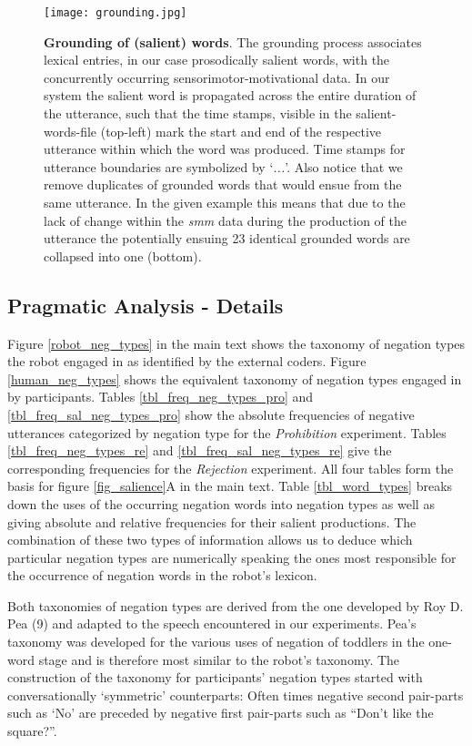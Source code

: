 \begin{screenonly}
\begin{figure}[h]
  \begin{center}
    \centerline{\texttt{[image: grounding.jpg]}}
    \caption{\textbf{Grounding of (salient) words}. The grounding process associates lexical entries, in our case prosodically salient words,
      with the concurrently occurring sensorimotor-motivational data. In our system the salient word is propagated across the entire duration of
      the utterance, such that the time stamps, visible in the salient-words-file (top-left) mark the start and end of the respective utterance
      within which the word was produced. Time stamps for utterance boundaries are symbolized by `\emph{...}'. Also notice that we remove duplicates
      of grounded words that would ensue from the same utterance. In the given example this means that due to the lack of change within the \emph{smm}
      data during the production of the utterance the potentially ensuing 23 identical grounded words are collapsed into one (bottom).}
    \label{fig_word_grounding}
  \end{center}
\end{figure}

\clearpage
  
\subsection{Pragmatic Analysis - Details}
Figure \ref{robot_neg_types} in the main text shows the taxonomy of negation types the robot engaged in as identified by the external coders. Figure 
\ref{human_neg_types} shows the equivalent taxonomy of negation types engaged in by participants. Tables \ref{tbl_freq_neg_types_pro} and 
\ref{tbl_freq_sal_neg_types_pro} show the absolute frequencies of negative utterances categorized by negation type for the \emph{Prohibition} experiment. 
Tables \ref{tbl_freq_neg_types_re} and \ref{tbl_freq_sal_neg_types_re} give the corresponding frequencies for the \emph{Rejection} experiment.
All four tables form the basis for figure \ref{fig_salience}A in the main text. Table \ref{tbl_word_types} breaks down the uses of the occurring negation words into 
negation types as well as giving absolute and relative frequencies for their salient productions. The combination of these two types of information 
allows us to deduce which particular negation types are numerically speaking the ones most responsible for the occurrence of negation words in the 
robot's lexicon.

Both taxonomies of negation types are derived from the one developed by Roy D. Pea (9) and adapted to the speech encountered in our experiments. Pea's
taxonomy was developed for the various uses of negation of toddlers in the one-word stage and is therefore most similar to the robot's taxonomy. The
construction of the taxonomy for participants' negation types started with conversationally `symmetric' counterparts: Often times negative second
pair-parts such as `No' are preceded by negative first pair-parts such as ``Don't like the square?''.
  

\end{screenonly}
